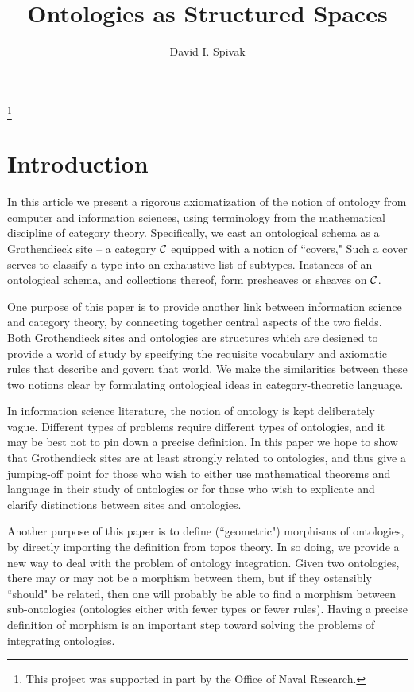 \documentclass{amsart}
\begin{document}
\title{Ontologies as Structured Spaces}

\thanks{This project was supported in part by the Office of Naval Research.}

\author{David I. Spivak}

\maketitle

\tableofcontents


\section{Introduction}

In this article we present a rigorous axiomatization of the notion of ontology from computer and information sciences, using terminology from the mathematical discipline of category theory.  Specifically, we cast an ontological schema as a Grothendieck site -- a category $\mathcal{C}$ equipped with a notion of ``covers,"  Such a cover serves to classify a type into an exhaustive list of subtypes.  Instances of an ontological schema, and collections thereof, form presheaves or sheaves on $\mathcal{C}$.

One purpose of this paper is to provide another link between information science and category theory, by connecting together central aspects of the two fields.  Both Grothendieck sites and ontologies are structures which are designed to provide a world of study by specifying the requisite vocabulary and axiomatic rules that describe and govern that world.  We make the similarities between these two notions clear by formulating ontological ideas in category-theoretic language.

In information science literature, the notion of ontology is kept deliberately vague.  Different types of problems require different types of ontologies, and it may be best not to pin down a precise definition.  In this paper we hope to show that Grothendieck sites are at least strongly related to ontologies, and thus give a jumping-off point for those who wish to either use mathematical theorems and language in their study of ontologies or for those who wish to explicate and clarify distinctions between sites and ontologies.  

Another purpose of this paper is to define (``geometric") morphisms of ontologies, by directly importing the definition from topos theory.  In so doing, we provide a new way to deal with the problem of ontology integration.  Given two ontologies, there may or may not be a morphism between them, but if they ostensibly ``should" be related, then one will probably be able to find a morphism between sub-ontologies (ontologies either with fewer types or fewer rules).  Having a precise definition of morphism is an important step toward solving the problems of integrating ontologies.
\end{document}
